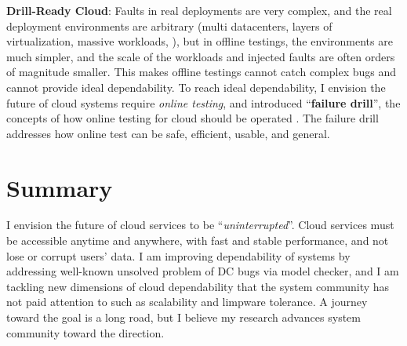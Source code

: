 \documentclass[10pt]{article}
\begin{document}

\noindent
\textbf{Drill-Ready Cloud}: Faults in real deployments are very complex, and
the real deployment environments are arbitrary (multi datacenters, layers of
virtualization, massive workloads, \etc), but in offline testings, the
environments are much simpler, and the scale of the workloads and injected
faults are often orders of magnitude smaller. This makes offline testings cannot
catch complex bugs and cannot provide ideal dependability.  To reach ideal
dependability, I envision the future of cloud systems require \textit{online
testing}, and introduced ``\textbf{failure drill}'', the concepts of how online
testing for cloud should be operated \cite{Leesatapornwongsa+14-Drill-fixed}.
The failure drill addresses how online test can be safe, efficient, usable, and
general.

\section{Summary}

I envision the future of cloud services to be ``\textit{uninterrupted}''. Cloud
services must be accessible anytime and anywhere, with fast and stable
performance, and not lose or corrupt users' data.
%
I am improving dependability of systems by addressing well-known unsolved
problem of DC bugs via model checker, and I am tackling new dimensions of cloud
dependability that the system community has not paid attention to such as
scalability and limpware tolerance.  A journey toward the goal is a long road,
but I believe my research advances system community toward the direction. 


\end{document}
